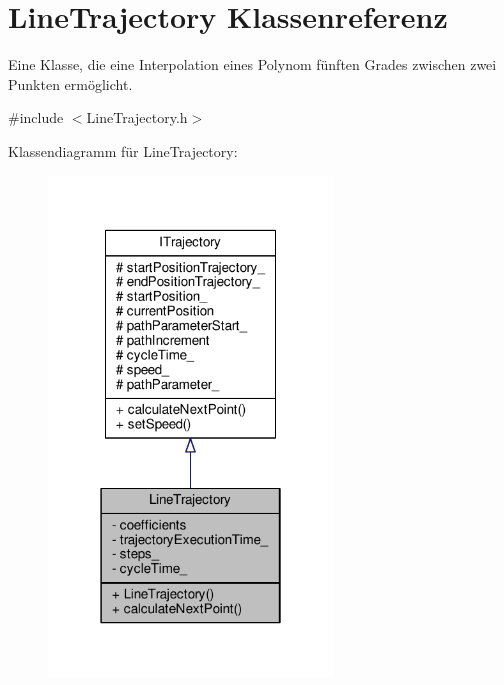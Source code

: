 \hypertarget{classLineTrajectory}{\section{Line\-Trajectory Klassenreferenz}
\label{classLineTrajectory}
}


Eine Klasse, die eine Interpolation eines Polynom fünften Grades zwischen zwei Punkten ermöglicht.  




{\ttfamily \#include $<$Line\-Trajectory.\-h$>$}



Klassendiagramm für Line\-Trajectory\-:
\nopagebreak
\begin{figure}[H]
\begin{center}
\leavevmode
\includegraphics[width=214pt]{classLineTrajectory__inherit__graph}
\end{center}
\end{figure}


